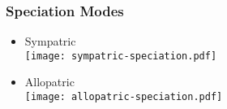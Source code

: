 \documentclass[11pt,t]{beamer}
\begin{document}
\begin{frame}
	\frametitle{Speciation Modes}
	\begin{itemize}
		\item Sympatric \\
			\texttt{[image: sympatric-speciation.pdf]}
		\item Allopatric \\
			\texttt{[image: allopatric-speciation.pdf]}			
	\end{itemize}
\end{frame}
\end{document}
